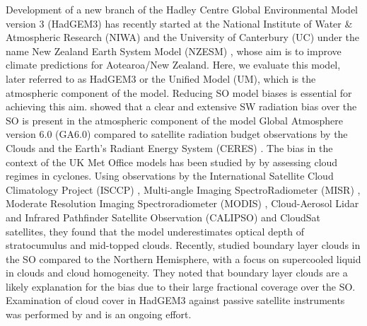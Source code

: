 Development of a new branch of the
Hadley Centre Global Environmental Model version 3 (HadGEM3)
has recently started at the National Institute of Water \& Atmospheric Research
(NIWA) and the University of Canterbury (UC) under the name New Zealand Earth
System Model (NZESM) \citep{williams2016},
whose aim is to improve climate predictions for
Aotearoa/New Zealand. Here, we evaluate this model, later referred to as
HadGEM3 or the Unified Model (UM), which is the atmospheric component of the model.
Reducing SO model biases is essential for
achieving this aim. \cite{walters2017}
showed that a clear and extensive SW radiation bias over the SO
is present in the atmospheric component of the model Global Atmosphere version 6.0 (GA6.0) compared to satellite
radiation budget observations by the Clouds and the Earth's Radiant Energy
System (CERES) \citep{wielicki1996}. The bias in the context of the UK Met Office
models has been studied by \cite{bodas-salcedo2012} by assessing cloud
regimes in cyclones.
Using observations by the International Satellite Cloud Climatology Project
(ISCCP) \citep{rossow1999},
Multi-angle Imaging SpectroRadiometer (MISR) \citep{diner1998}, Moderate Resolution Imaging Spectroradiometer (MODIS) \citep{salomonson2002},
Cloud-Aerosol Lidar and Infrared Pathfinder Satellite Observation
(CALIPSO) \citep{winker2010} and CloudSat \citep{stephens2002} satellites,
they found that the model underestimates optical depth of stratocumulus and
mid-topped clouds. Recently, \cite{davies2017} studied boundary layer
clouds in the SO compared to the Northern Hemisphere,
with a focus on supercooled liquid in clouds and cloud homogeneity.
They noted that boundary layer clouds are a likely explanation for the bias
due to their large fractional coverage over the SO.
Examination of cloud cover in HadGEM3 against passive satellite instruments
was performed by \cite{schuddeboom2017,schuddeboom2019} and is an ongoing effort.

